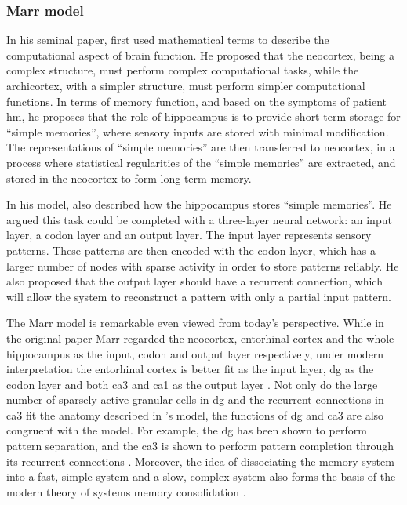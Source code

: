 \subsubsection{Marr model \label{hpc-marr}}
In his seminal paper, \citet{marr71} first used mathematical terms to describe the computational aspect of brain function. He proposed that the neocortex, being a complex structure, must perform complex computational tasks, while the archicortex, with a simpler structure, must perform simpler computational functions. In terms of memory function, and based on the symptoms of patient \gls{hm}, he proposes that the role of hippocampus is to provide short-term storage for ``simple memories'', where sensory inputs are stored with minimal modification. The representations of ``simple memories'' are then transferred to neocortex, in a process where statistical regularities of the ``simple memories'' are extracted, and stored in the neocortex to form long-term memory. 

In his model, \citet{marr71} also described how the hippocampus stores ``simple memories''. He argued this task could be completed with a three-layer neural network: an input layer, a codon layer and an output layer. The input layer represents sensory patterns. These patterns are then encoded with the codon layer, which has a larger number of nodes with sparse activity in order to store patterns reliably. He also proposed that the output layer should have a recurrent connection, which will allow the system to reconstruct a pattern with only a partial input pattern. 

The Marr model is remarkable even viewed from today's perspective. While in the original paper Marr \citep{marr71} regarded the neocortex, entorhinal cortex and the whole hippocampus as the input, codon and output layer respectively, under modern interpretation the entorhinal cortex is better fit as the input layer, \gls{dg} as the codon layer and both \gls{ca3} and \gls{ca1} as the output layer \citep{willshaw15}. Not only do the large number of sparsely active granular cells in \gls{dg} and the recurrent connections in \gls{ca3} fit the anatomy described in \citet{marr71}'s model, the functions of \gls{dg} and \gls{ca3} are also congruent with the model. For example, the \gls{dg} has been shown to perform pattern separation, and the \gls{ca3} is shown to perform pattern completion through its recurrent connections \citep{knierim16}. Moreover, the idea of dissociating the memory system into a fast, simple system and a slow, complex system also forms the basis of the modern theory of systems memory consolidation \citep{squire92, mcclelland13}. 

